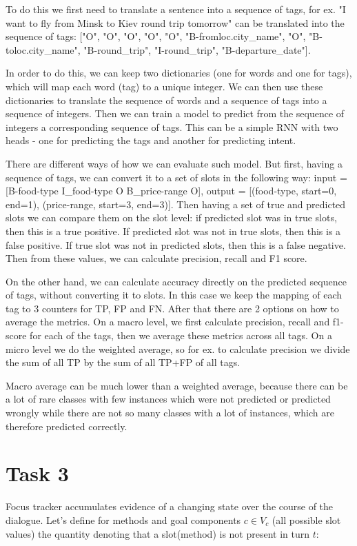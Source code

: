 \documentclass[12pt,titlepage,a4paper]{article}
\begin{document}
To do this we first need to translate a sentence into a sequence of tags, for ex. "I want to fly from Minsk to Kiev round trip tomorrow" can be translated into the sequence of tags: ["O", "O", "O", "O", "O", "B-fromloc.city\_name", "O", "B-toloc.city\_name", "B-round\_trip", "I-round\_trip", "B-departure\_date"].

In order to do this, we can keep two dictionaries (one for words and one for tags), which will map each word (tag) to a unique integer. We can then use these dictionaries to translate the sequence of words and a sequence of tags into a sequence of integers. Then we can train a model to predict from the sequence of integers a corresponding sequence of tags. This can be a simple RNN with two heads - one for predicting the tags and another for predicting intent. 

There are different ways of how we can evaluate such model. But first, having a sequence of tags, we can convert it to a set of slots in the following way: input = [B-food-type I\_food-type O B\_price-range O], output = [(food-type, start=0, end=1), (price-range, start=3, end=3)]. Then having a set of true and predicted slots we can compare them on the slot level: if predicted slot was in true slots, then this is a true positive. If predicted slot was not in true slots, then this is a false positive. If true slot was not in predicted slots, then this is a false negative. Then from these values, we can calculate precision, recall and F1 score.

On the other hand, we can calculate accuracy directly on the predicted sequence of tags, without converting it to slots. In this case we keep the mapping of each tag to 3 counters for TP, FP and FN. After that there are 2 options on how to average the metrics. On a macro level, we first calculate precision, recall and f1-score for each of the tags, then we average these metrics across all tags. On a micro level we do the weighted average, so for ex. to calculate precision we divide the sum of all TP by the sum of all TP+FP of all tags. 

Macro average can be much lower than a weighted average, because there can be a lot of rare classes with few instances which were not predicted or predicted wrongly while there are not so many classes with a lot of instances, which are therefore predicted correctly.
\section{Task 3}
Focus tracker accumulates evidence of a changing state over the course of the dialogue. Let's define for methods and goal components $c \in V_c$ (all possible slot values) the quantity denoting that a slot(method) is not present in turn $t$:
\end{document}
